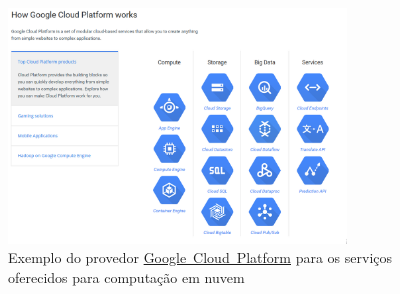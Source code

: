 \begin{figure}[ht]
    \centering
    \includegraphics[width=0.8\textwidth]{img/googlecloud.png}
    \caption{Exemplo do provedor
             \href{https://cloud.google.com/}{Google~Cloud~Platform}
             para os serviços oferecidos para computação em nuvem
            }
    \label{img:googlecloud}
\end{figure}

\undef\itemm
